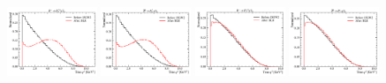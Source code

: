 \begin{figure}[ht]
    \centering
    \includegraphics[width=0.24\textwidth]{
        ./figs-mc-correction/reweighting-form-factors/DststMu/D0stst0Mu.pdf
    }
    \includegraphics[width=0.24\textwidth]{
        ./figs-mc-correction/reweighting-form-factors/DststMu/D0ststMu.pdf
    }
    \includegraphics[width=0.24\textwidth]{
        ./figs-mc-correction/reweighting-form-factors/DststMu/D1pstst0Mu.pdf
    }
    \includegraphics[width=0.24\textwidth]{
        ./figs-mc-correction/reweighting-form-factors/DststMu/D1pststMu.pdf
    }


\end{figure}
